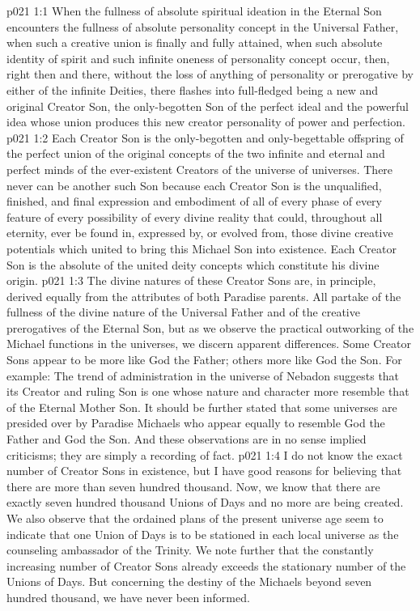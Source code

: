 \vs p021 1:1 When the fullness of absolute spiritual ideation in the Eternal Son encounters the fullness of absolute personality concept in the Universal Father, when such a creative union is finally and fully attained, when such absolute identity of spirit and such infinite oneness of personality concept occur, then, right then and there, without the loss of anything of personality or prerogative by either of the infinite Deities, there flashes into full\hyp{}fledged being a new and original Creator Son, the only\hyp{}begotten Son of the perfect ideal and the powerful idea whose union produces this new creator personality of power and perfection.
\vs p021 1:2 Each Creator Son is the only\hyp{}begotten and only\hyp{}begettable offspring of the perfect union of the original concepts of the two infinite and eternal and perfect minds of the ever\hyp{}existent Creators of the universe of universes. There never can be another such Son because each Creator Son is the unqualified, finished, and final expression and embodiment of all of every phase of every feature of every possibility of every divine reality that could, throughout all eternity, ever be found in, expressed by, or evolved from, those divine creative potentials which united to bring this Michael Son into existence. Each Creator Son is the absolute of the united deity concepts which constitute his divine origin.
\vs p021 1:3 The divine natures of these Creator Sons are, in principle, derived equally from the attributes of both Paradise parents. All partake of the fullness of the divine nature of the Universal Father and of the creative prerogatives of the Eternal Son, but as we observe the practical outworking of the Michael functions in the universes, we discern apparent differences. Some Creator Sons appear to be more like God the Father; others more like God the Son. For example: The trend of administration in the universe of Nebadon suggests that its Creator and ruling Son is one whose nature and character more resemble that of the Eternal Mother Son. It should be further stated that some universes are presided over by Paradise Michaels who appear equally to resemble God the Father and God the Son. And these observations are in no sense implied criticisms; they are simply a recording of fact.
\vs p021 1:4 I do not know the exact number of Creator Sons in existence, but I have good reasons for believing that there are more than seven hundred thousand. Now, we know that there are exactly seven hundred thousand Unions of Days and no more are being created. We also observe that the ordained plans of the present universe age seem to indicate that one Union of Days is to be stationed in each local universe as the counseling ambassador of the Trinity. We note further that the constantly increasing number of Creator Sons already exceeds the stationary number of the Unions of Days. But concerning the destiny of the Michaels beyond seven hundred thousand, we have never been informed.

